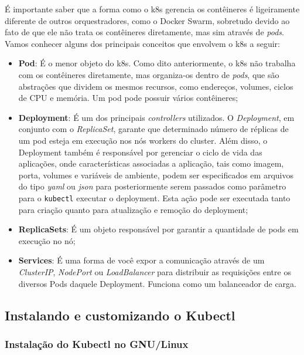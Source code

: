 \documentclass[12pt,a4paper]{article}
\begin{document}
É importante saber que a forma como o k8s gerencia os contêineres é ligeiramente diferente de outros orquestradores, como o Docker Swarm, sobretudo devido ao fato de que ele não trata os contêineres diretamente, mas sim através de \textit{pods}. Vamos conhecer alguns dos principais conceitos que envolvem o k8s a seguir:

\begin{itemize}
    \item \textbf{Pod}: É o menor objeto do k8s. Como dito anteriormente, o k8s não trabalha com os contêineres diretamente, mas organiza-os dentro de \textit{pods}, que são abstrações que dividem os mesmos recursos, como endereços, volumes, ciclos de CPU e memória. Um pod pode possuir vários contêineres;
    \item \textbf{Deployment}: É um dos principais \textit{controllers} utilizados. O \textit{Deployment}, em conjunto com o \textit{ReplicaSet}, garante que determinado número de réplicas de um pod esteja em execução nos nós workers do cluster. Além disso, o Deployment também é responsável por gerenciar o ciclo de vida das aplicações, onde características associadas a aplicação, tais como imagem, porta, volumes e variáveis de ambiente, podem ser especificados em arquivos do tipo \textit{yaml} ou \textit{json} para posteriormente serem passados como parâmetro para o \texttt{kubectl} executar o deployment. Esta ação pode ser executada tanto para criação quanto para atualização e remoção do deployment;
    \item \textbf{ReplicaSets}: É um objeto responsável por garantir a quantidade de pods em execução no nó;
    \item \textbf{Services}: É uma forma de você expor a comunicação através de um \textit{ClusterIP}, \textit{NodePort} ou \textit{LoadBalancer} para distribuir as requisições entre os diversos Pods daquele Deployment. Funciona como um balanceador de carga.
\end{itemize}


\subsection{Instalando e customizando o Kubectl}
\label{sec:kubectl}

\subsubsection{Instalação do Kubectl no GNU/Linux}
\label{sec:kubectl_linux}
\end{document}
